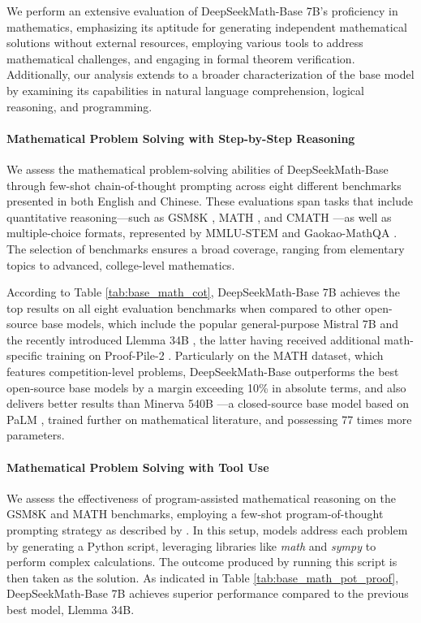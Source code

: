 \begin{itemize}[topsep=0pt]
We perform an extensive evaluation of DeepSeekMath-Base 7B’s proficiency in mathematics, emphasizing its aptitude for generating independent mathematical solutions without external resources, employing various tools to address mathematical challenges, and engaging in formal theorem verification. Additionally, our analysis extends to a broader characterization of the base model by examining its capabilities in natural language comprehension, logical reasoning, and programming.

\paragraph{Mathematical Problem Solving with Step-by-Step Reasoning}

We assess the mathematical problem-solving abilities of DeepSeekMath-Base through few-shot chain-of-thought prompting \citep{cot} across eight different benchmarks presented in both English and Chinese. These evaluations span tasks that include quantitative reasoning—such as GSM8K \citep{gsm8k}, MATH \citep{MATH}, and CMATH \citep{wei2023cmath}—as well as multiple-choice formats, represented by MMLU-STEM \citep{mmlu} and Gaokao-MathQA \citep{agieval}. The selection of benchmarks ensures a broad coverage, ranging from elementary topics to advanced, college-level mathematics.

According to Table \ref{tab:base_math_cot}, DeepSeekMath-Base 7B achieves the top results on all eight evaluation benchmarks when compared to other open-source base models, which include the popular general-purpose Mistral 7B \citep{mistral} and the recently introduced Llemma 34B \citep{llemma}, the latter having received additional math-specific training on Proof-Pile-2 \citep{llemma}. Particularly on the MATH dataset, which features competition-level problems, DeepSeekMath-Base outperforms the best open-source base models by a margin exceeding 10\% in absolute terms, and also delivers better results than Minerva 540B \citep{minerva}—a closed-source base model based on PaLM \citep{palm}, trained further on mathematical literature, and possessing 77 times more parameters.

\paragraph{Mathematical Problem Solving with Tool Use} We assess the effectiveness of program-assisted mathematical reasoning on the GSM8K and MATH benchmarks, employing a few-shot program-of-thought prompting strategy as described by \citet{pot,pal}. In this setup, models address each problem by generating a Python script, leveraging libraries like \textit{math} and \textit{sympy} to perform complex calculations. The outcome produced by running this script is then taken as the solution. As indicated in Table \ref{tab:base_math_pot_proof}, DeepSeekMath-Base 7B achieves superior performance compared to the previous best model, Llemma 34B.


\end{itemize}
